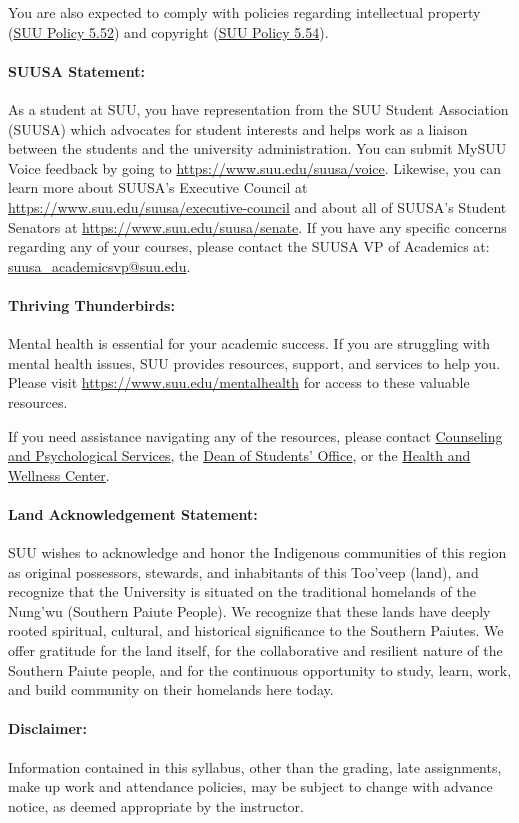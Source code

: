 \documentclass[12pt, letterpaper]{article}
\begin{document}
\noindent
You are also expected to comply with policies regarding intellectual property (\href{https://www.suu.edu/policies/05/52.html}{SUU Policy 5.52}) and copyright (\href{https://www.suu.edu/policies/05/54.html}{SUU Policy 5.54}).

\paragraph{SUUSA Statement:}
As a student at SUU, you have representation from the SUU Student Association (SUUSA) which advocates for student interests and helps work as a liaison between the students and the university administration. You can submit MySUU Voice feedback by going to \href{https://www.suu.edu/suusa/voice}{https://www.suu.edu/suusa/voice}. Likewise, you can learn more about SUUSA’s Executive Council at \href{https://www.suu.edu/suusa/executive-council}{https://www.suu.edu/suusa/executive-council} and about all of SUUSA’s Student Senators at \href{https://www.suu.edu/suusa/senate}{https://www.suu.edu/suusa/senate}. If you have any specific concerns regarding any of your courses, please contact the SUUSA VP of Academics at: \href{suusa_academicsvp@suu.edu}{suusa\_\ignorespaces academicsvp@suu.edu}.

\paragraph{Thriving Thunderbirds:}
Mental health is essential for your academic success. If you are struggling with mental health issues, SUU provides resources, support, and services to help you. Please visit \href{https://www.suu.edu/mentalhealth}{https://www.suu.edu/mentalhealth} for access to these valuable resources.

\noindent
If you need assistance navigating any of the resources, please contact \href{https://www.suu.edu/caps/}{Counseling and Psychological Services}, the \href{https://www.suu.edu/deanofstudents/}{Dean of Students’ Office}, or the \href{https://www.suu.edu/health/}{Health and Wellness Center}.

\paragraph{Land Acknowledgement Statement:}
SUU wishes to acknowledge and honor the Indigenous communities of this region as original possessors, stewards, and inhabitants of this Too’veep (land), and recognize that the University is situated on the traditional homelands of the Nung’wu (Southern Paiute People). We recognize that these lands have deeply rooted spiritual, cultural, and historical significance to the Southern Paiutes. We offer gratitude for the land itself, for the collaborative and resilient nature of the Southern Paiute people, and for the continuous opportunity to study, learn, work, and build community on their homelands here today.

\paragraph{Disclaimer:}
Information contained in this syllabus, other than the grading, late assignments, make up work and attendance policies, may be subject to change with advance notice, as deemed appropriate by the instructor.
\end{document}
